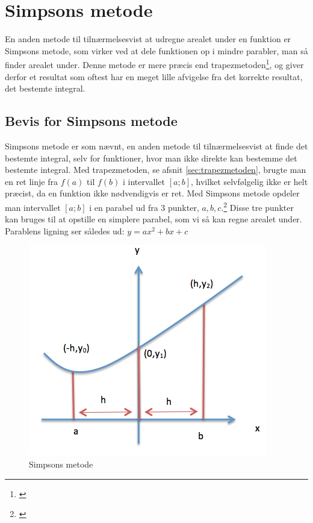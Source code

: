 \documentclass[12pt]{article}
\numberwithin{equation}{section}
\begin{document}
\section{Simpsons metode}
\label{sec:simpsonsmetode}
En anden metode til tilnærmelsesvist at udregne arealet under en funktion er Simpsons metode, som virker ved at dele funktionen op i mindre parabler, man så finder arealet under. Denne metode er mere præcis end trapezmetoden\footnote{\cite[s. 15]{2012matA}}, og giver derfor et resultat som oftest har en meget lille afvigelse fra det korrekte resultat, det bestemte integral.
\subsection{Bevis for Simpsons metode}
Simpsons metode er som nævnt, en anden metode til tilnærmelsesvist at finde det bestemte integral, selv for funktioner, hvor man ikke direkte kan bestemme det bestemte integral. Med trapezmetoden, se afsnit \ref{sec:trapezmetoden}, brugte man en ret linje fra $f(a)$ til $f(b)$ i intervallet $[a;b]$, hvilket selvfølgelig ikke er helt præcist, da en funktion ikke nødvendigvis er ret. Med Simpsons metode opdeler man intervallet $[a;b]$ i en parabel ud fra 3 punkter, $a,b,c$.\footnote{\cite{simpsonsmetode}} Disse tre punkter kan bruges til at opstille en simplere parabel, som vi så kan regne arealet under. Parablens ligning ser således ud: $y=ax^2+bx+c$
\begin{figure}[H]
\centering
\includegraphics[width=0.6\linewidth]{Billeder/Simpsonsmetode}
\caption{Simpsons metode}
\label{fig:simpsonsmetode}
\end{figure}
\end{document}

